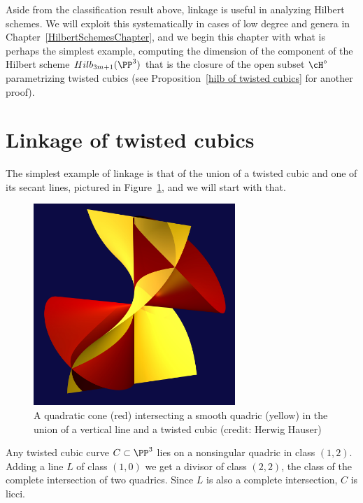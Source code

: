 Aside from the classification result above, linkage is useful in analyzing Hilbert schemes. We will exploit this systematically in cases of low degree and genera in Chapter~\ref{HilbertSchemesChapter}, and we begin
this chapter with what is perhaps the simplest example, computing the dimension of the component of
the Hilbert scheme $Hilb_{3m+1}(\PP^3)$ that is the closure of the open subset $\cH^\circ$  parametrizing twisted cubics (see Proposition~\ref{hilb of twisted cubics} for another proof).

\section{Linkage of twisted cubics}
The simplest example of linkage is that of the union of a twisted cubic and one of its secant lines, pictured in
Figure~\ref{cubicAndLine}, and we will start with that.

\begin{figure}\label{cubicAndLine}
 \caption{A quadratic cone (red) intersecting a smooth quadric (yellow) in the union of a vertical line and a twisted cubic (credit: Herwig Hauser)}
\centerline {\includegraphics[height=3in]{"twist&shout.jpg"}}
\end{figure}

Any twisted cubic curve $C\subset \PP^{3}$ lies on a nonsingular quadric in class $(1,2)$. Adding a line $L$ of class
$(1,0)$ we get a  divisor of class $(2,2)$, the class of the complete intersection of two quadrics. Since $L$ is also 
a complete intersection, $C$ is licci.


